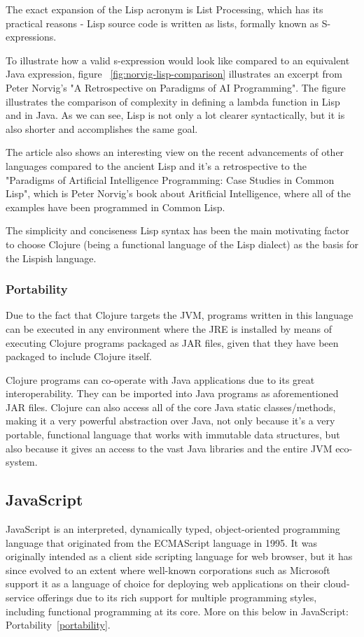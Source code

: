 The exact expansion of the Lisp acronym is List Processing, which has its practical reasons - Lisp source code is written as lists, formally known as S-expressions\cite{s-expression}\cite{s-expression-wiki}.

To illustrate how a valid s-expression would look like compared to an equivalent Java expression, figure ~\ref{fig:norvig-lisp-comparison} illustrates an excerpt from Peter Norvig's "A Retrospective on Paradigms of AI Programming"\cite{retrospective.norvig}. The figure illustrates the comparison of complexity in defining a lambda function in Lisp and in Java. 
As we can see, Lisp is not only a lot clearer syntactically, but it is also shorter and accomplishes the same goal.  



The article also shows an interesting view on the recent advancements of other languages compared to the ancient Lisp and it's a retrospective to the "Paradigms of Artificial Intelligence Programming: Case Studies in Common Lisp"\cite{PAIP.Norvig}, which is Peter Norvig's book about Aritficial Intelligence, where all of the examples have been programmed in Common Lisp.


The simplicity and conciseness Lisp syntax has been the main motivating factor to choose Clojure (being a functional language of the Lisp dialect) as the basis for the Lispish language. 

\subsubsection{Portability}
Due to the fact that Clojure targets the JVM, programs written in this language can be executed in any environment where the JRE is installed by means of executing Clojure programs packaged as JAR files, given that they have been packaged to include Clojure itself.  

Clojure programs can co-operate with Java applications due to its great interoperability. They can be imported into Java programs as aforementioned JAR files.
Clojure can also access all of the core Java static classes/methods, making it a very powerful abstraction over Java, not only because it's a very portable, functional language that works with immutable data structures, but also because it gives an access to the vast Java libraries and the entire JVM eco-system.

\subsection{JavaScript}
JavaScript is an interpreted, dynamically typed, object-oriented programming language that originated from the ECMAScript language in 1995. It was originally intended as a client side scripting language for web browser, but it has since evolved to an extent where well-known corporations such as Microsoft support it as a language of choice for deploying web applications  on their cloud-service offerings due to its rich support for multiple programming styles, including functional programming at its core. More on this below in JavaScript: Portability~\ref{portability}.  

